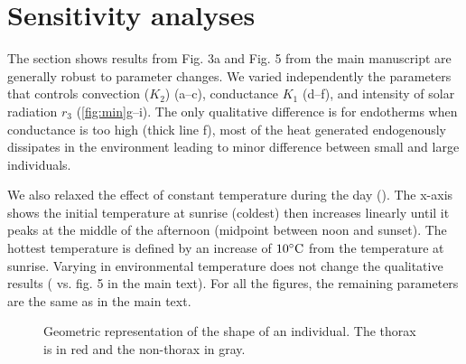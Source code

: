\documentclass[11pt]{article}
\begin{document}
\section{Sensitivity analyses}
The section shows results from Fig. 3a and Fig. 5 from the main manuscript are generally robust to parameter changes.
We varied independently the parameters that controls convection ($K_2$) (a--c), conductance $K_1$ (d--f), and intensity of solar radiation $r_3$ (\cref{fig:min}g--i).
The only qualitative difference is for endotherms when conductance is too high (thick line f), most of the heat generated endogenously dissipates in the environment leading to minor difference between small and large individuals.

We also relaxed the effect of constant temperature during the day ().
The x-axis shows the initial temperature at sunrise (coldest) then increases linearly until it peaks at the middle of the afternoon (midpoint between noon and sunset). The hottest temperature is defined by an increase of $10 ^{\circ}\rm{C}$ from the temperature at sunrise.
Varying in environmental temperature does not change the qualitative results ( vs. fig. 5 in the main text).
For all the figures, the remaining parameters are the same as in the main text.

\begin{figure}
\begin{center}
	\caption{
		\setstretch{\stretchby}
		Geometric representation of the shape of an individual.
		The thorax is in red and the non-thorax in gray.
	}
	\label{fig:geo}
\end{center}
\end{figure}
\end{document}
